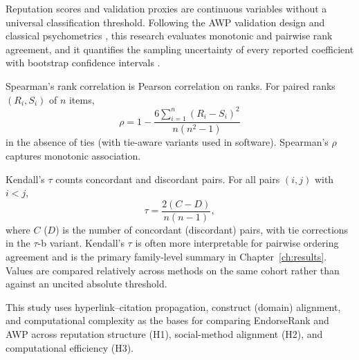 
Reputation scores and validation proxies are continuous variables without a universal classification threshold. Following the AWP validation design and classical psychometrics , this research evaluates monotonic and pairwise rank agreement, and it quantifies the sampling uncertainty of every reported coefficient with bootstrap confidence intervals .

Spearman's rank correlation  is Pearson correlation on ranks. For paired ranks $(R_i,S_i)$ of $n$ items,
\begin{equation}
\rho = 1 - \frac{6\sum_{i=1}^n (R_i-S_i)^2}{n(n^2-1)}
\label{eq:spearman}
\end{equation}
in the absence of ties (with tie-aware variants used in software). Spearman's $\rho$ captures monotonic association.

Kendall's $\tau$  counts concordant and discordant pairs. For all pairs $(i,j)$ with $i<j$,
\begin{equation}
\tau = \frac{2(C - D)}{n(n-1)},
\label{eq:kendall}
\end{equation}
where $C$ ($D$) is the number of concordant (discordant) pairs, with tie corrections in the $\tau$-b variant. Kendall's $\tau$ is often more interpretable for pairwise ordering agreement and is the primary family-level summary in Chapter~\ref{ch:results}. Values are compared relatively across methods on the same cohort rather than against an uncited absolute threshold.


This study uses hyperlink--citation propagation, construct (domain) alignment, and computational complexity as the bases for comparing EndorseRank and AWP across reputation structure (H1), social-method alignment (H2), and computational efficiency (H3).

